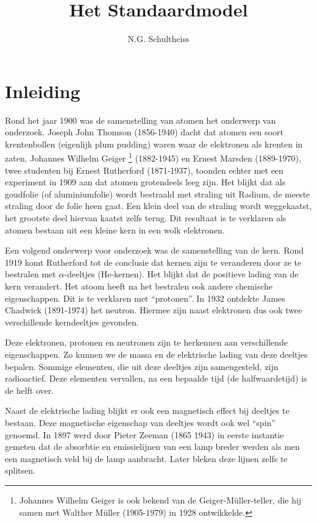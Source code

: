 



\title{Het Standaardmodel}
\author{N.G. Schultheiss}
\date{}

\maketitle
\thispagestyle{firststyle}

\section{Inleiding}

Rond het jaar 1900 was de samenstelling van atomen het onderwerp van
onderzoek. Joseph John Thomson (1856-1940) dacht dat atomen een soort
krentenbollen (eigenlijk plum pudding) waren waar de elektronen als
krenten in zaten. Johannes Wilhelm Geiger \footnote{Johannes Wilhelm
Geiger is ook bekend van de Geiger-Müller-teller, die hij samen met
Walther Müller (1905-1979) in 1928 ontwikkelde.} (1882-1945) en Ernest
Marsden (1889-1970), twee studenten bij Ernest Rutherford (1871-1937),
toonden echter met een experiment in 1909 aan dat atomen grotendeels
leeg zijn. Het blijkt dat als goudfolie (of aluminiumfolie) wordt
bestraald met straling uit Radium, de meeste straling door de folie heen
gaat. Een klein deel van de straling wordt weggekaatst, het grootste
deel hiervan kaatst zelfs terug. Dit resultaat is te verklaren als
atomen bestaan uit een kleine kern in een wolk elektronen.

Een volgend onderwerp voor onderzoek was de samenstelling van de kern.
Rond 1919 komt Rutherford tot de conclusie dat kernen zijn te veranderen
door ze te bestralen met $\alpha$-deeltjes (He-kernen). Het blijkt
dat de positieve lading van de kern verandert. Het atoom heeft na
het bestralen ook andere chemische eigenschappen. Dit is te verklaren
met ``protonen''. In 1932 ontdekte James Chadwick (1891-1974) het
neutron. Hiermee zijn naast elektronen dus ook twee verschillende
kerndeeltjes gevonden. 

Deze elektronen, protonen en neutronen zijn te herkennen aan verschillende
eigenschappen. Zo kunnen we de massa en de elektrische lading van
deze deeltjes bepalen. Sommige elementen, die uit deze deeltjes zijn
samengesteld, zijn radioactief. Deze elementen vervallen, na een bepaalde
tijd (de halfwaardetijd) is de helft over.

Naast de elektrische lading blijkt er ook een magnetisch effect bij
deeltjes te bestaan. Deze magnetische eigenschap van deeltjes wordt
ook wel ``spin'' genoemd. In 1897 werd door Pieter Zeeman (1865
\textendash{} 1943) in eerste instantie gemeten dat de absorbtie en
emissielijnen van een lamp breder werden als men een magnetisch veld
bij de lamp aanbracht. Later bleken deze lijnen zelfs te splitsen. 

